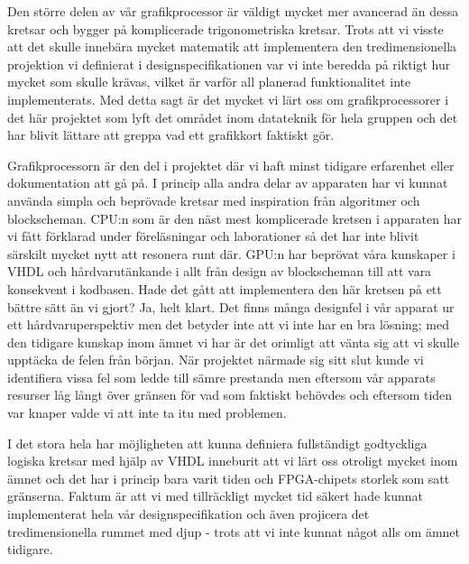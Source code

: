 \documentclass[a4paper]{article}
\begin{document}
        Den större
        delen av vår grafikprocessor är väldigt mycket mer avancerad än dessa kretsar och bygger
        på komplicerade trigonometriska kretsar. Trots att vi visste att det skulle innebära mycket
        matematik att implementera den tredimensionella projektion vi definierat i 
        designspecifikationen var vi inte beredda på riktigt hur mycket som skulle krävas, vilket är
        varför all planerad funktionalitet inte implementerats. Med detta sagt är det mycket vi
        lärt oss om grafikprocessorer i det här projektet som lyft det området inom datateknik för
        hela gruppen och det har blivit lättare att greppa vad ett grafikkort faktiskt gör.

        Grafikprocessorn är den del i projektet där vi haft minst tidigare erfarenhet eller
        dokumentation att gå på. I princip alla andra delar av apparaten har vi kunnat använda
        simpla och beprövade kretsar med inspiration från algoritmer och blockscheman. CPU:n som är
        den näst mest komplicerade kretsen i apparaten har vi fått förklarad under föreläsningar och
        laborationer så det har inte blivit särskilt mycket nytt att resonera runt där. GPU:n har
        beprövat våra kunskaper i VHDL och hårdvarutänkande i allt från design av blockscheman till
        att vara konsekvent i kodbasen. Hade det gått att implementera den här kretsen på ett bättre
        sätt än vi gjort? Ja, helt klart. Det finns många designfel i vår apparat ur ett
        hårdvaruperspektiv men det betyder inte att vi inte har en bra lösning; med den tidigare
        kunskap inom ämnet vi har är det orimligt att vänta sig att vi skulle upptäcka de felen från
        början. När projektet närmade sig sitt slut kunde vi identifiera vissa fel som ledde till
        sämre prestanda men eftersom vår apparats resurser låg långt över gränsen för vad som
        faktiskt behövdes och eftersom tiden var knaper valde vi att inte ta itu med problemen.

        I det stora hela har möjligheten att kunna definiera fullständigt godtyckliga logiska 
        kretsar med hjälp av VHDL inneburit att vi lärt oss otroligt mycket inom ämnet och det har
        i princip bara varit tiden och FPGA-chipets storlek som satt gränserna. Faktum är att vi
        med tillräckligt mycket tid säkert hade kunnat implementerat hela vår designspecifikation
        och även projicera det tredimensionella rummet med djup - trots att vi inte kunnat något
        alls om ämnet tidigare.
\end{document}
